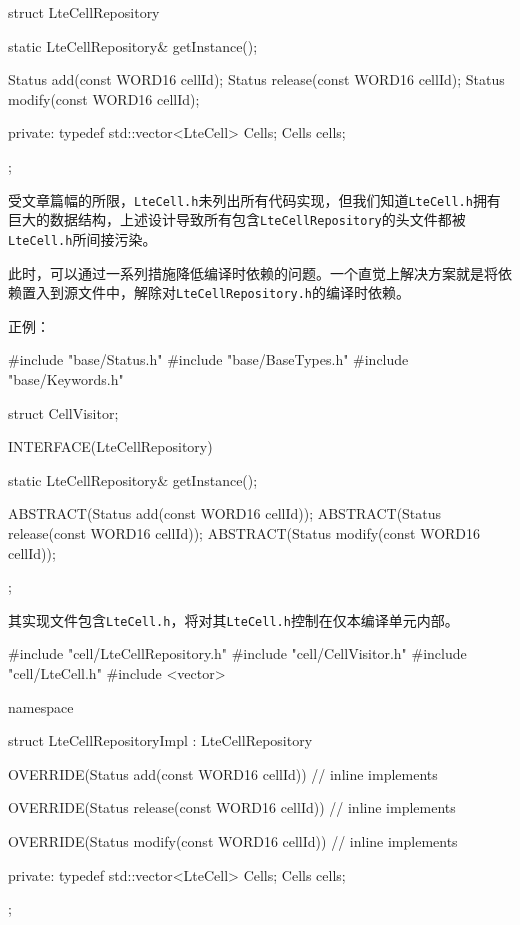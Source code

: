 \begin{content}
\begin{leftbar}
\begin{c++}
struct LteCellRepository
{
    static LteCellRepository& getInstance();

    Status add(const WORD16 cellId);
    Status release(const WORD16 cellId);
    Status modify(const WORD16 cellId);
    
private:
    typedef std::vector<LteCell> Cells;
    Cells cells;
};
\end{c++}
\end{leftbar}

受文章篇幅的所限，\texttt{LteCell.h}未列出所有代码实现，但我们知道\texttt{LteCell.h}拥有巨大的数据结构，上述设计导致所有包含\texttt{LteCellRepository}的头文件都被\texttt{LteCell.h}所间接污染。

此时，可以通过一系列措施降低编译时依赖的问题。一个直觉上解决方案就是将依赖置入到源文件中，解除对\texttt{LteCellRepository.h}的编译时依赖。

正例：
\begin{leftbar}
\begin{c++}
#include "base/Status.h"
#include "base/BaseTypes.h"
#include "base/Keywords.h"

struct CellVisitor;

INTERFACE(LteCellRepository)
{
    static LteCellRepository& getInstance();

    ABSTRACT(Status add(const WORD16 cellId));
    ABSTRACT(Status release(const WORD16 cellId));
    ABSTRACT(Status modify(const WORD16 cellId));
};
\end{c++}
\end{leftbar}

其实现文件包含\texttt{LteCell.h}，将对其\texttt{LteCell.h}控制在仅本编译单元内部。

\begin{leftbar}
\begin{c++}
#include "cell/LteCellRepository.h"
#include "cell/CellVisitor.h"
#include "cell/LteCell.h"
#include <vector>

namespace
{
    struct LteCellRepositoryImpl : LteCellRepository
    {
        OVERRIDE(Status add(const WORD16 cellId))
        {
            // inline implements
        }

        OVERRIDE(Status release(const WORD16 cellId))
        {
            // inline implements
        }

        OVERRIDE(Status modify(const WORD16 cellId))
        {
            // inline implements
        }
    
    private:
        typedef std::vector<LteCell> Cells;
        Cells cells;
    };
}


\end{c++}
\end{leftbar}
\end{content}
